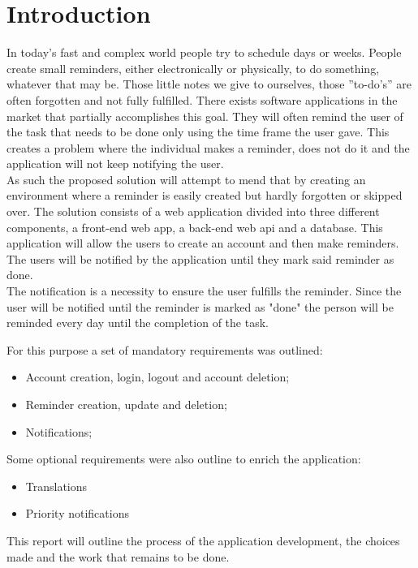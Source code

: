 \chapter{Introduction}

In today’s fast and complex world people try to schedule days or weeks. People create small
reminders, either electronically or physically, to do something, whatever that may be. Those
little notes we give to ourselves, those ”to-do’s” are often forgotten and not fully fulfilled.
There exists software applications in the market that partially accomplishes this goal. They will often remind the user of the task that needs to be done only using the time frame the user gave. This creates a problem where the individual makes a reminder,
does not do it and the application will not keep notifying the user.\\
As such the proposed solution will attempt to mend that by creating an environment where a reminder is easily
created but hardly forgotten or skipped over. The solution consists of a web application divided into three different components, a front-end web app, a back-end web \gls{api} and a database. This application will allow the users to create
an account and then make reminders. The users will be notified by the application until they mark said reminder as done.\\
The notification is a necessity to ensure the user fulfills the reminder. Since the user will be notified until the reminder is marked as "done" the person will be reminded every day until the completion of the task.

For this purpose a set of mandatory requirements was outlined:
\begin{itemize}
	\item Account creation, login, logout and account deletion;
	\item Reminder creation, update and deletion;
	\item Notifications;
\end{itemize}

Some optional requirements were also outline to enrich the application:
\begin{itemize}
	\item Translations
	\item Priority notifications
\end{itemize}

This report will outline the process of the application development, the choices made and the work
that remains to be done.